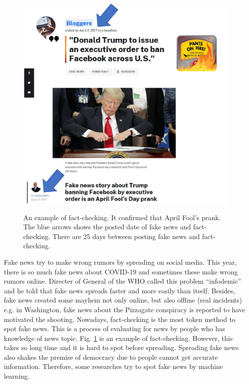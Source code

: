 \documentclass[conference]{IEEEtran}
\begin{document}
\begin{figure}[!t]
    \centering
    \includegraphics[width=\linewidth]{fact-check.pdf}
    \label{fig:example}
    \caption{
        An example of fact-checking. It confirmed that April Fool's prank.
        The blue arrows shows the posted date of fake news and fact-checking.
        There are 25 days between posting fake news and fact-checking.
    }
\end{figure}


Fake news try to make wrong rumors by spreading on social media.
This year, there is so much fake news about COVID-19 and sometimes these make wrong rumors online.
Directer of General of the WHO called this problem ``infodemic'' and he told that fake news spreads faster and more easily than itself\cite{ZAROCOSTAS2020676}. 
Besides, fake news created some mayhem not only online, but also offline (real incidents)
e.g. in Washington, fake news about the Pizzagate conspiracy is reported to have motivated the shooting\cite{agencies_2016}.
Nowadays, fact-checking is the most token method to spot fake news.
This is a process of evaluating for news by people who has knowledge of news topic.
Fig. \ref{fig:example} is an example of fact-checking\cite{gillin_2017}.
However, this takes so long time and it is hard to spot before spreading.
Spreading fake news also shakes the premise of democracy due to people cannot get accurate information.
Therefore, some researches try to spot fake news by machine learning.
\end{document}
